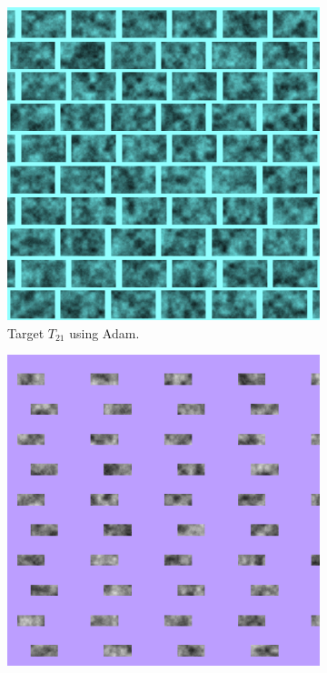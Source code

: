 \begin{figure}[h]
\centering
\begin{subfigure}[t]{.25\textwidth}
    \centering
    \includegraphics[width=\linewidth]{img/evaluation/M2/2param/SBL_Adam_two_param_final.png}
    \caption{Target $T_{21}$ using Adam.}
    \label{fig:M2SBLFinalRenders2paramAdam}
\end{subfigure}\hspace{0.5cm}
\begin{subfigure}[t]{.25\textwidth}
    \centering
    \includegraphics[width=\linewidth]{img/evaluation/M2/random/SBL_Adam_random_final.png}

\end{subfigure}
\end{figure}
